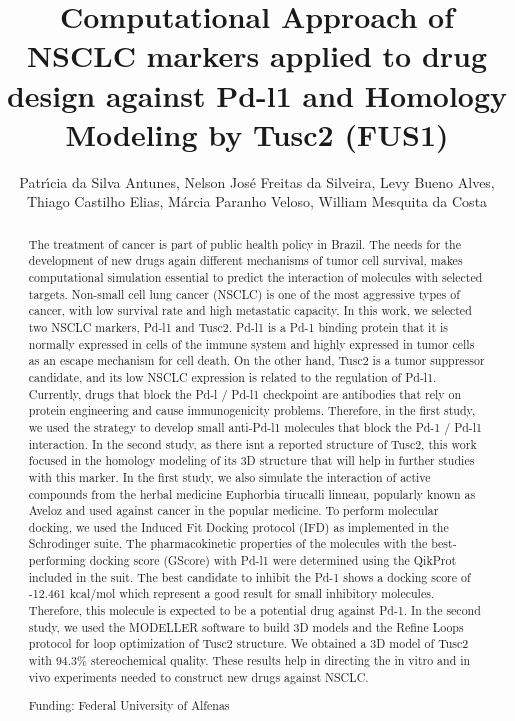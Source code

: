 \documentclass[twoside]{article}
\title{\vspace{-15mm}\fontsize{24pt}{10pt}\selectfont\textbf{ Computational Approach of NSCLC markers applied to drug design against Pd-l1 and Homology Modeling by Tusc2 (FUS1) }} %
\author{ Patr\'{\i}cia da Silva Antunes, Nelson Jos\'e Freitas da Silveira, Levy Bueno Alves, Thiago Castilho Elias, M\'arcia Paranho Veloso, William Mesquita da Costa }
\affil{ Universidade Federal de Alfenas }
\date{}
\begin{document}
  
  
  \maketitle %
  
  
  \thispagestyle{fancy} %
  
  
  \begin{abstract}
  The treatment of cancer is part of public health policy in Brazil. The needs for the development of new drugs again different mechanisms of tumor cell survival,  makes computational simulation essential to predict the interaction of molecules with selected targets. Non-small cell lung cancer (NSCLC) is one of the most aggressive types of cancer,  with low survival rate and high metastatic capacity. In this work,  we selected two NSCLC markers,  Pd-l1 and Tusc2. Pd-l1 is a Pd-1 binding protein that it is normally expressed in cells of the immune system and highly expressed in tumor cells as an escape mechanism for cell death. On the other hand,  Tusc2 is a tumor suppressor candidate,  and its low NSCLC expression is related to the regulation of Pd-l1. Currently,  drugs that block the Pd-l / Pd-l1 checkpoint are antibodies that rely on protein engineering and cause immunogenicity problems. Therefore,  in the first study,  we used the strategy to develop small anti-Pd-l1 molecules that block the Pd-1 / Pd-l1 interaction. In the second study,  as there isnt a reported structure of Tusc2,  this work focused in the homology modeling of its 3D structure that will help in further studies with this marker. In the first study,  we also simulate the interaction of active compounds from the herbal medicine Euphorbia tirucalli linneau,  popularly known as Aveloz and used against cancer in the popular medicine. To perform molecular docking,  we used the Induced Fit Docking protocol (IFD) as implemented in the Schrodinger suite. The pharmacokinetic properties of the molecules with the best-performing docking score (GScore) with Pd-l1 were determined using the QikProt included in the suit. The best candidate to inhibit the Pd-1 shows a docking score of -12.461 kcal/mol which represent a good result for small inhibitory molecules. Therefore,  this molecule is expected to be a potential drug against Pd-1. In the second study,  we used the MODELLER software to build 3D models and the Refine Loops protocol for loop optimization of Tusc2 structure. We obtained a 3D model of Tusc2 with 94.3\% stereochemical quality. These results help in directing the in vitro and in vivo experiments needed to construct new drugs against NSCLC.
  
  Funding: Federal University of Alfenas \\ 
  \end{abstract}
  
\end{document}
